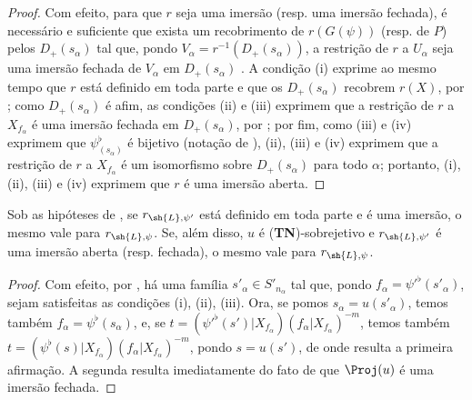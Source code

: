 \documentclass[oneside,10pt]{amsart}
\let\EGAOriginalLabel\label
\renewcommand{\label}[1]{\phantomsection\EGAOriginalLabel{#1}}
\begin{document}
\begin{proof}
Com efeito, para que $r$ seja uma imersão (resp. uma imersão fechada), é necessário e suficiente que exista um recobrimento de $r(G(\psi))$ (resp. de $P$) pelos $D_+(s_\alpha)$ tal que, pondo $V_\alpha=r^{-1}(D_+(s_\alpha))$, a restrição de $r$ a $U_\alpha$ seja uma imersão fechada de $V_\alpha$ em $D_+(s_\alpha)$ .
A condição (i) exprime ao mesmo tempo que $r$ está definido em toda parte e que os $D_+(s_\alpha)$ recobrem $r(X)$, por ;
como $D_+(s_\alpha)$ é afim, as condições (ii) e (iii) exprimem que a restrição de $r$ a $X_{f_\alpha}$ é uma imersão fechada em $D_+(s_\alpha)$, por ;
por fim, como (iii) e (iv) exprimem que $\psi_{(s_\alpha)}^\flat$ é bijetivo (notação de ), (ii), (iii) e (iv) exprimem que a restrição de $r$ a $X_{f_\alpha}$ é um isomorfismo sobre $D_+(s_\alpha)$ para todo $\alpha$;
portanto, (i), (ii), (iii) e (iv) exprimem que $r$ é uma imersão aberta.
\end{proof}

\begin{corollary}[3.8.3]
\label{II.3.8.3}
Sob as hipóteses de , se $r_{\sh{L},\psi'}$ está definido em toda parte e é uma imersão, o mesmo vale para $r_{\sh{L},\psi}$.
Se, além disso, $u$ é (\textbf{TN})-sobrejetivo e $r_{\sh{L},\psi'}$ é uma imersão aberta (resp. fechada), o mesmo vale para $r_{\sh{L},\psi}$.
\end{corollary}

\begin{proof}
Com efeito, por , há uma família $s'_\alpha\in S'_{n_\alpha}$ tal que, pondo $f_\alpha=\psi'^\flat(s'_\alpha)$, sejam satisfeitas as condições (i), (ii), (iii).
Ora, se pomos $s_\alpha=u(s'_\alpha)$, temos também $f_\alpha=\psi^\flat(s_\alpha)$, e, se $t=(\psi'^\flat(s')|X_{f_\alpha})(f_\alpha|X_{f_\alpha})^{-m}$, temos também $t=(\psi^\flat(s)|X_{f_\alpha})(f_\alpha|X_{f_\alpha})^{-m}$, pondo $s=u(s')$, de onde resulta a primeira afirmação.
A segunda resulta imediatamente do fato de que $\Proj(u)$ é uma imersão fechada.
\end{proof}
\end{document}
